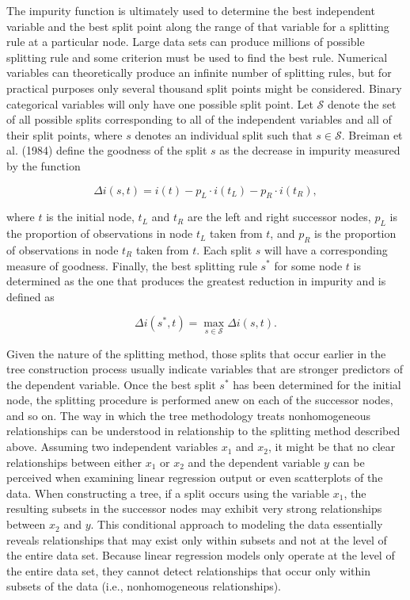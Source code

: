 The impurity function is ultimately used to determine the best independent variable and the best split point along the range of that variable for a splitting rule at a particular node.  Large data sets can produce millions of possible splitting rule and some criterion must be used to find the best rule.  Numerical variables can theoretically produce an infinite number of splitting rules, but for practical purposes only several thousand split points might be considered.   Binary categorical variables will only have one possible split point.  Let $\mathcal{S}$ denote the set of all possible splits corresponding to all of the independent variables and all of their split points, where $s$ denotes an individual split such that $s \in \mathcal{S}$.  Breiman et al. (1984) define the goodness of the split $s$ as the decrease in impurity measured by the function

\begin{equation}
\Delta i(s, t) = i(t) - p_L \cdot i(t_L) - p_R \cdot i(t_R),
\end{equation}

\noindent where $t$ is the initial node, $t_L$ and $t_R$ are the left and right successor nodes, $p_L$ is the proportion of observations in node $t_L$ taken from $t$, and $p_R$ is the proportion of observations in node $t_R$ taken from $t$.  Each split $s$ will have a corresponding measure of goodness.  Finally, the best splitting rule $s^*$ for some node $t$ is determined as the one that produces the greatest reduction in impurity and is defined as

\begin{equation}
\Delta i (s^*, t) = \max_{s \in \mathcal{S}} \Delta i(s, t).
\end{equation}

Given the nature of the splitting method, those splits that occur earlier in the tree construction process usually indicate variables that are stronger predictors of the dependent variable.  Once the best split $s^*$ has been determined for the initial node, the splitting procedure is performed anew on each of the successor nodes, and so on.  The way in which the tree methodology treats nonhomogeneous relationships can be understood in relationship to the splitting method described above.  Assuming two independent variables $x_1$ and $x_2$, it might be that no clear relationships between either $x_1$ or $x_2$ and the dependent variable $y$ can be perceived when examining linear regression output or even scatterplots of the data.  When constructing a tree, if a split occurs using the variable $x_1$, the resulting subsets in the successor nodes may exhibit very strong relationships between $x_2$ and $y$.  This conditional approach to modeling the data essentially reveals relationships that may exist only within subsets and not at the level of the entire data set.  Because linear regression models only operate at the level of the entire data set, they cannot detect relationships that occur only within subsets of the data (i.e., nonhomogeneous relationships).

